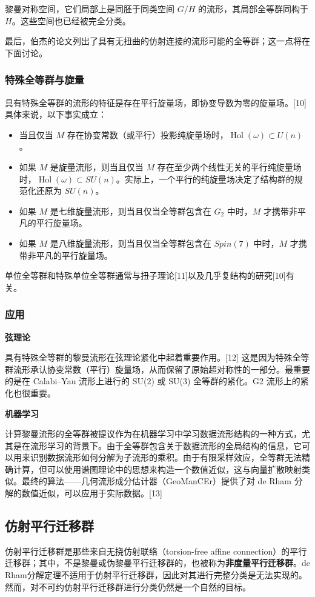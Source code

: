 黎曼对称空间，它们局部上是同胚于同类空间 \( G/H \) 的流形，其局部全等群同构于 \( H \)。这些空间也已经被完全分类。

最后，伯杰的论文列出了具有无扭曲的仿射连接的流形可能的全等群；这一点将在下面讨论。
\subsubsection{特殊全等群与旋量}
具有特殊全等群的流形的特征是存在平行旋量场，即协变导数为零的旋量场。[10] 具体来说，以下事实成立：
\begin{itemize}
\item 当且仅当 \( M \) 存在协变常数（或平行）投影纯旋量场时，\( \operatorname{Hol}(\omega) \subset U(n) \)。
\item 如果 \( M \) 是旋量流形，则当且仅当 \( M \) 存在至少两个线性无关的平行纯旋量场时，\( \operatorname{Hol}(\omega) \subset SU(n) \)。实际上，一个平行的纯旋量场决定了结构群的规范化还原为 \( SU(n) \)。
\item 如果 \( M \) 是七维旋量流形，则当且仅当全等群包含在 \( G_2 \) 中时，\( M \) 才携带非平凡的平行旋量场。
\item 如果 \( M \) 是八维旋量流形，则当且仅当全等群包含在 \( Spin(7) \) 中时，\( M \) 才携带非平凡的平行旋量场。
\end{itemize}
单位全等群和特殊单位全等群通常与扭子理论[11]以及几乎复结构的研究[10]有关。
\subsubsection{应用}
\textbf{弦理论}  

具有特殊全等群的黎曼流形在弦理论紧化中起着重要作用。[12] 这是因为特殊全等群流形承认协变常数（平行）旋量场，从而保留了原始超对称性的一部分。最重要的是在 Calabi–Yau 流形上进行的 SU(2) 或 SU(3) 全等群的紧化。G2 流形上的紧化也很重要。

\textbf{机器学习}  

计算黎曼流形的全等群被提议作为在机器学习中学习数据流形结构的一种方式，尤其是在流形学习的背景下。由于全等群包含关于数据流形的全局结构的信息，它可以用来识别数据流形如何分解为子流形的乘积。由于有限采样效应，全等群无法精确计算，但可以使用谱图理论中的思想来构造一个数值近似，这与向量扩散映射类似。最终的算法——几何流形成分估计器（GeoManCEr）提供了对 de Rham 分解的数值近似，可以应用于实际数据。[13]
\subsection{仿射平行迁移群}
仿射平行迁移群是那些来自无挠仿射联络（torsion-free affine connection）的平行迁移群；其中，不是黎曼或伪黎曼平行迁移群的，也被称为\textbf{非度量平行迁移群}。de Rham分解定理不适用于仿射平行迁移群，因此对其进行完整分类是无法实现的。然而，对不可约仿射平行迁移群进行分类仍然是一个自然的目标。

